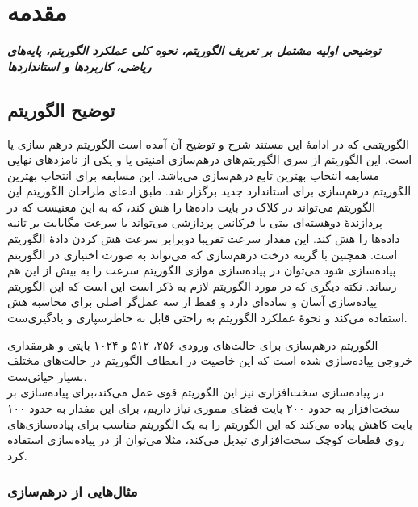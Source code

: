 \chapter{مقدمه}
\noindent
\textbf{
\textit{
توضیحی اولیه مشتمل بر تعریف الگوریتم، نحوه کلی عملکرد الگوریتم، پایه‌های ریاضی، کاربردها و استانداردها
}
}
\pagebreak
\section{توضیح الگوریتم}
\par
الگوریتمی که در ادامهٔ این مستند شرح و توضیح آن آمده است الگوریتم درهم سازی 
یا 
است. این الگوریتم از سری الگوریتم‌های درهم‌سازی امنیتی یا 
 و یکی از نامزدهای نهایی مسابقه انتخاب بهترین تابع درهم‌سازی 
 می‌باشد. این مسابقه برای انتخاب بهترین الگوریتم در‌هم‌سازی برای استاندارد جدید 
 برگزار شد. 
 طبق ادعای طراحان الگوریتم این الگوریتم می‌تواند در 
 کلاک در بایت داده‌ها را هش کند، که به این معنیست که در پردازندهٔ دوهسته‌ای
  بیتی با فرکانس پردازشی
    می‌تواند با سرعت 
  مگابایت بر ثانیه داده‌ها را هش کند. این مقدار سرعت تقریبا دوبرابر سرعت هش کردن دادهٔ الگوریتم 
  است. همچنین با گزینه درخت درهم‌سازی که می‌تواند به صورت اختیازی در الگوریتم پیاده‌سازی شود می‌توان 	در پیاده‌سازی موازی الگوریتم سرعت را به بیش از این هم رساند. نکته دیگری که در مورد الگوریتم 
  لازم به ذکر است این است که این الگوریتم پیاده‌سازی آسان و ساده‌ای دارد و فقط از سه عمل‌گر اصلی برای محاسبه هش استفاده می‌کند و نحوهٔ عملکرد الگوریتم به راحتی قابل به خاطرسپاری و یادگیری‌ست. 
  \par
  الگوریتم درهم‌سازی
  برای حالت‌های ورودی ۲۵۶، ۵۱۲ و ۱۰۲۴ بایتی و هرمقداری خروجی پیاده‌سازی شده است که این خاصیت در انعطاف الگوریتم در حالت‌های مختلف بسیار حیاتی‌ست. 
  \\
  در پیاده‌سازی سخت‌افزاری نیز این الگوریتم قوی عمل می‌کند،‌برای پیاده‌سازی 
  بر سخت‌افزار به حدود ۲۰۰ بایت فضای مموری نیاز داریم، برای 
  این مفدار به حدود ۱۰۰ بایت کاهش پیاده می‌کند که این الگوریتم را به یک الگوریتم مناسب برای پیاده‌سازی‌های روی قطعات کوچک سخت‌افزاری تبدیل می‌کند، مثلا می‌توان از 
  در پیاده‌سازی 
  استفاده کرد.
  \cite{skein}
 
  
  \subsection{مثال‌هایی از درهم‌سازی}

